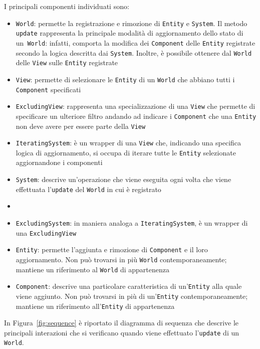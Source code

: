 I principali componenti individuati sono:
\begin{itemize}
    \item \texttt{World}: permette la registrazione e rimozione di \texttt{Entity} e \texttt{System}.
    Il metodo \texttt{update} rappresenta la principale modalità di aggiornamento dello stato di un~\texttt{World}: infatti, comporta la modifica dei \texttt{Component} delle \texttt{Entity} registrate secondo la logica descritta dai \texttt{System}.
    Inoltre, è possibile ottenere dal \texttt{World} delle \texttt{View} sulle \texttt{Entity} registrate
    \item \texttt{View}: permette di selezionare le \texttt{Entity} di un \texttt{World} che abbiano tutti i \texttt{Component} specificati
    \item \texttt{ExcludingView}: rappresenta una specializzazione di una \texttt{View} che permette di specificare un ulteriore filtro andando ad indicare i \texttt{Component} che una \texttt{Entity} non deve avere per essere parte della \texttt{View}
    \item \texttt{IteratingSystem}: è un wrapper di una \texttt{View} che, indicando una specifica logica di aggiornamento, si occupa di iterare tutte le \texttt{Entity} selezionate aggiornandone i componenti
    \item \texttt{System}: descrive un'operazione che viene eseguita ogni volta che viene effettuata l'\texttt{update} del \texttt{World} in cui è registrato
    \item \item \texttt{ExcludingSystem}: in maniera analoga a \texttt{IteratingSystem}, è un wrapper di una \texttt{ExcludingView}
    \item \texttt{Entity}: permette l'aggiunta e rimozione di \texttt{Component} e il loro aggiornamento.
    Non può trovarsi in più \texttt{World} contemporaneamente;
    mantiene un riferimento al \texttt{World} di appartenenza
    \item \texttt{Component}: descrive una particolare caratteristica di un'\texttt{Entity} alla quale viene aggiunto.
    Non può trovarsi in più di un'\texttt{Entity} contemporaneamente;
    mantiene un riferimento all'\texttt{Entity} di appartenenza
\end{itemize}

In Figura~\ref{fig:sequence} è riportato il diagramma di sequenza che descrive le principali interazioni che si verificano quando viene effettuato l'\texttt{update} di un \texttt{World}.

